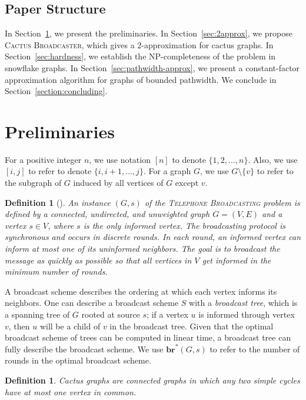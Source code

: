 \documentclass[letterpaper,11pt]{article}
\newtheorem{definition}[theorem]{Definition}
\newcommand{\flower}{snowflake\xspace}
\newcommand{\bropt}{{\boldsymbol{br}^*}}
\newcommand{\telebr}{\textsc{Telephone Broadcasting}\xspace}
\newcommand{\ouralgo}{\textsc{Cactus Broadcaster}\xspace}
\begin{document}
\subsection{Paper Structure}
In Section~\ref{sec:preliminaries}, we present the preliminaries.
In Section~\ref{sec:2approx}, we propose \ouralgo, which gives a $2$-approximation 
for cactus graphs. In Section~\ref{sec:hardness}, we 
establish the NP-completeness of the problem in \flower graphs.
In Section~\ref{sec:pathwidth-approx}, 
we present a constant-factor approximation algorithm for graphs of bounded pathwidth. 
We conclude in Section~\ref{section:concluding}. 

 \section{Preliminaries} \label{sec:preliminaries}
For a positive integer $n$, we use notation $[n]$ to denote 
$\{1,2,\ldots, n\}$. Also, we use $[i,j]$ to refer to denote $\{i,i+1,\ldots, j\}$. 
For a graph $G$, we use $G\setminus \{v\}$ to refer to the subgraph of $G$ induced by all vertices of $G$ except $v$.
 \begin{definition}[\cite{hedetniemi1988broadsurvey}]
    An instance $(G,s)$ of the 
     \emph{\telebr} problem  
     is defined by a connected, undirected, and unweighted graph $G=(V, E)$ and a vertex $s \in V$, where $s$ is the only informed vertex. 
     The broadcasting protocol is synchronous and occurs in discrete rounds. In each round, an informed vertex can inform at most one of its uninformed neighbors. The goal is to broadcast the message as quickly as possible so that all vertices in $V$ get informed in the minimum number of rounds.
 \end{definition}

A broadcast scheme describes the ordering at which each vertex informs its neighbors. One can describe a broadcast scheme $S$ with a \emph{broadcast tree}, which is a spanning tree of $G$ rooted at source $s$; if a vertex $u$ is informed through vertex $v$, then $u$ will be a child of $v$ in the broadcast tree. Given that the optimal broadcast scheme of trees can be computed in linear time, a broadcast tree can fully describe the broadcast scheme. We use $\bropt(G,s)$ to refer to the number of rounds in the optimal broadcast scheme. 

\begin{definition}
    \emph{Cactus graphs} are 
    connected graphs in which any two simple cycles 
    have at most one vertex in common.
\end{definition}
\end{document}
